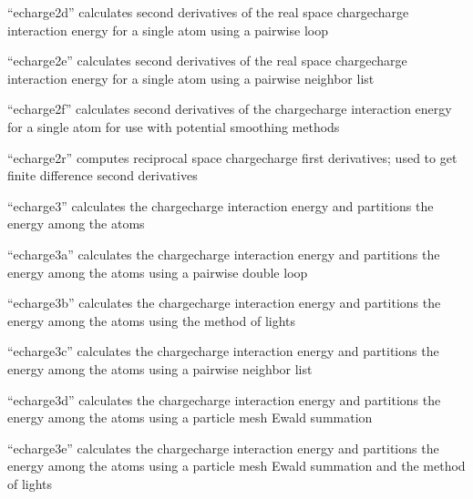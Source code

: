 \documentclass[letterpaper,11pt,english]{sphinxmanual}
\begin{document}
“echarge2d” calculates second derivatives of the real space
charge\sphinxhyphen{}charge interaction energy for a single atom using a
pairwise loop


“echarge2e” calculates second derivatives of the real space
charge\sphinxhyphen{}charge interaction energy for a single atom using a
pairwise neighbor list


“echarge2f” calculates second derivatives of the charge\sphinxhyphen{}charge
interaction energy for a single atom for use with potential
smoothing methods


“echarge2r” computes reciprocal space charge\sphinxhyphen{}charge first
derivatives; used to get finite difference second derivatives


“echarge3” calculates the charge\sphinxhyphen{}charge interaction energy
and partitions the energy among the atoms


“echarge3a” calculates the charge\sphinxhyphen{}charge interaction energy
and partitions the energy among the atoms using a pairwise
double loop


“echarge3b” calculates the charge\sphinxhyphen{}charge interaction energy
and partitions the energy among the atoms using the method
of lights


“echarge3c” calculates the charge\sphinxhyphen{}charge interaction energy
and partitions the energy among the atoms using a pairwise
neighbor list


“echarge3d” calculates the charge\sphinxhyphen{}charge interaction energy
and partitions the energy among the atoms using a particle
mesh Ewald summation


“echarge3e” calculates the charge\sphinxhyphen{}charge interaction energy
and partitions the energy among the atoms using a particle
mesh Ewald summation and the method of lights
\end{document}
